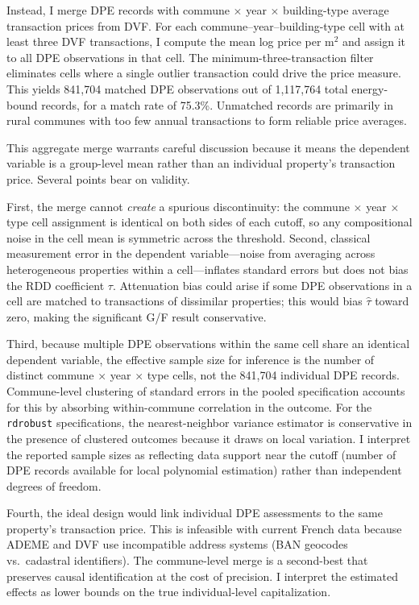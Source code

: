 \documentclass[12pt]{article}
\begin{document}
Instead, I merge DPE records with commune $\times$ year $\times$ building-type average transaction prices from DVF. For each commune--year--building-type cell with at least three DVF transactions, I compute the mean log price per m$^2$ and assign it to all DPE observations in that cell. The minimum-three-transaction filter eliminates cells where a single outlier transaction could drive the price measure. This yields 841,704 matched DPE observations out of 1,117,764 total energy-bound records, for a match rate of 75.3\%. Unmatched records are primarily in rural communes with too few annual transactions to form reliable price averages.

This aggregate merge warrants careful discussion because it means the dependent variable is a group-level mean rather than an individual property's transaction price. Several points bear on validity.

First, the merge cannot \textit{create} a spurious discontinuity: the commune $\times$ year $\times$ type cell assignment is identical on both sides of each cutoff, so any compositional noise in the cell mean is symmetric across the threshold. Second, classical measurement error in the dependent variable---noise from averaging across heterogeneous properties within a cell---inflates standard errors but does not bias the RDD coefficient $\tau$. Attenuation bias could arise if some DPE observations in a cell are matched to transactions of dissimilar properties; this would bias $\hat{\tau}$ toward zero, making the significant G/F result conservative.

Third, because multiple DPE observations within the same cell share an identical dependent variable, the effective sample size for inference is the number of distinct commune $\times$ year $\times$ type cells, not the 841,704 individual DPE records. Commune-level clustering of standard errors in the pooled specification accounts for this by absorbing within-commune correlation in the outcome. For the \texttt{rdrobust} specifications, the nearest-neighbor variance estimator is conservative in the presence of clustered outcomes because it draws on local variation. I interpret the reported sample sizes as reflecting data support near the cutoff (number of DPE records available for local polynomial estimation) rather than independent degrees of freedom.

Fourth, the ideal design would link individual DPE assessments to the same property's transaction price. This is infeasible with current French data because ADEME and DVF use incompatible address systems (BAN geocodes vs.\ cadastral identifiers). The commune-level merge is a second-best that preserves causal identification at the cost of precision. I interpret the estimated effects as lower bounds on the true individual-level capitalization.
\end{document}
